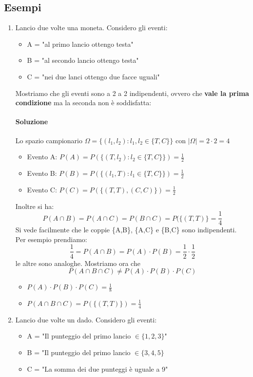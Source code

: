 \documentclass{report}
\begin{document}
\subsection{Esempi}
\begin{enumerate}
    \item Lancio due volte una moneta. Considero gli eventi: \begin{itemize}
        \item A = "al primo lancio ottengo testa"
        \item B = "al secondo lancio ottengo testa"
        \item C = "nei due lanci ottengo due facce uguali"
    \end{itemize}
    Mostriamo che gli eventi sono a 2 a 2 indipendenti, ovvero che \textbf{vale la prima condizione} ma la seconda non è soddisfatta:
    \paragraph{Soluzione} Lo spazio campionario \(\Omega = \{(l_1, l_2): l_1,l_2 \in \{T,C\}\}\) con \(|\Omega| = 2\cdot 2 = 4\)
    \begin{itemize}
        \item Evento A: \(P(A) = P(\{(T,l_2): l_2 \in \{T,C\}\}) = \frac{1}{2}\)
        \item Evento B: \(P(B) = P(\{(l_1, T): l_1 \in \{T,C\}\}) = \frac{1}{2}\)
        \item Evento C: \(P(C) = P(\{(T, T), (C,C)\}) = \frac{1}{2}\)
    \end{itemize}
    Inoltre si ha: \[P(A \cap B) = P(A \cap C) = P(B \cap C) = P(\{(T,T)\} = \frac{1}{4}\]
    Si vede facilmente che le coppie \{A,B\}, \{A,C\} e \{B,C\} sono indipendenti.\\
    Per esempio prendiamo: \[\frac{1}{4} = P(A \cap B) = P(A) \cdot P(B) = \frac{1}{2}\cdot \frac{1}{2}\] le altre sono analoghe.
    Mostriamo ora che \[P(A \cap B \cap C) \neq P(A)\cdot P(B)\cdot P(C)\]
    \begin{itemize}
        \item \(P(A)\cdot P(B)\cdot P(C) = \frac{1}{8}\)
        \item \(P(A \cap B \cap C) = P(\{(T,T)\}) = \frac{1}{4}\)
    \end{itemize}
    \item Lancio due volte un dado. Considero gli eventi: \begin{itemize}
        \item A = "Il punteggio del primo lancio \(\in \{1,2,3\}\)"
        \item B = "Il punteggio del primo lancio \(\in \{3,4,5\}\)
        \item C = "La somma dei due punteggi è uguale a 9"
    \end{itemize}

\end{enumerate}
\end{document}
